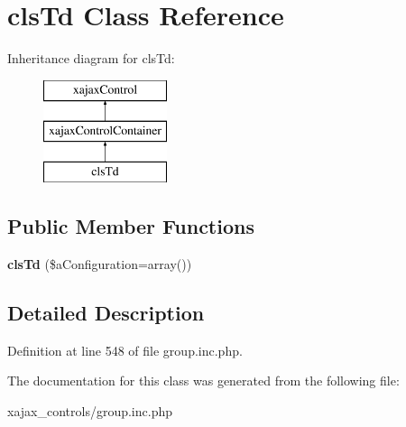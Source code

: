\hypertarget{classclsTd}{
\section{clsTd Class Reference}
\label{classclsTd}
}
Inheritance diagram for clsTd:\begin{figure}[H]
\begin{center}
\leavevmode
\includegraphics[height=3.000000cm]{classclsTd}
\end{center}
\end{figure}
\subsection*{Public Member Functions}
\begin{DoxyCompactItemize}
\item 
\hypertarget{classclsTd_ad120fb631576f54d3029c06e94ec1988}{
{\bfseries clsTd} (\$aConfiguration=array())}
\label{classclsTd_ad120fb631576f54d3029c06e94ec1988}

\end{DoxyCompactItemize}


\subsection{Detailed Description}


Definition at line 548 of file group.inc.php.



The documentation for this class was generated from the following file:\begin{DoxyCompactItemize}
\item 
xajax\_\-controls/group.inc.php\end{DoxyCompactItemize}

